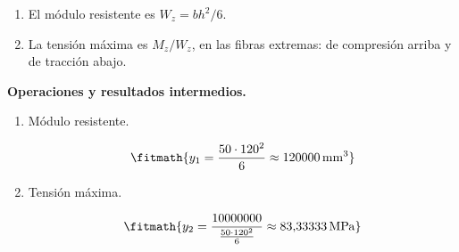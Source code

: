 \begin{enumerate}

\item El módulo resistente es $W_z = b h^2/6$.

\item La tensión máxima es $M_z/W_z$, en las fibras extremas: de compresión arriba y de tracción abajo.

\end{enumerate}

\noindent\textbf{Operaciones y resultados intermedios.}

\begin{enumerate}

\item Módulo resistente.

\[\fitmath{y_{1}=\frac{50\cdot {120}^{2}}{6}\approx 120000\,\mathrm{mm^{3}}}\]

\item Tensión máxima.

\[\fitmath{y_{2}=\frac{10000000}{\frac{50\cdot {120}^{2}}{6}}\approx 83{,}33333\,\mathrm{MPa}}\]

\end{enumerate}
